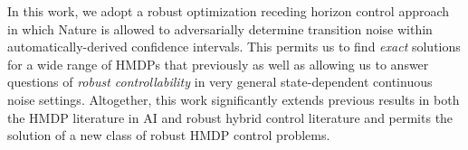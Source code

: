 In this work, we adopt a robust optimization receding horizon control
approach in which Nature is allowed to adversarially determine
transition noise within automatically-derived confidence intervals.
This permits us to find \emph{exact} solutions for a wide range of
HMDPs that previously as well as allowing us to answer questions of \emph{robust
controllability} in very general state-dependent continuous noise settings.
Altogether, this work significantly extends previous results in both
the HMDP literature in AI and robust hybrid control literature
and permits the solution of a new class of robust HMDP control problems.


